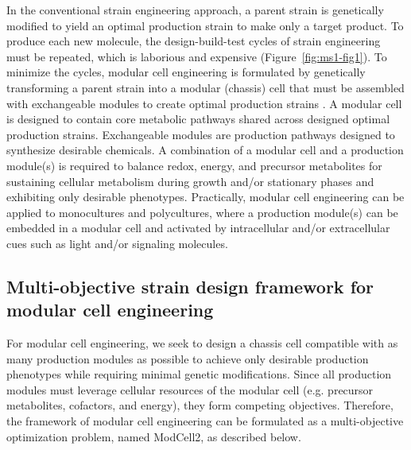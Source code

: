 In the conventional strain engineering approach, a parent strain is genetically modified to yield an optimal production strain to make only a target product.
To produce each new molecule, the design-build-test cycles of strain engineering must be repeated, which is laborious and expensive (Figure~\ref{fig:ms1-fig1}).
To minimize the cycles, modular cell engineering is formulated by genetically transforming a parent strain into a modular (chassis) cell that must be assembled with exchangeable modules to create optimal production strains \citep{trinh2015}.
A modular cell is designed to contain core metabolic pathways shared across designed optimal production strains.
Exchangeable modules are production pathways designed to synthesize desirable chemicals.
A combination of a modular cell and a production module(s) is required to balance redox, energy, and precursor metabolites for sustaining cellular metabolism during growth and/or stationary phases and exhibiting only desirable phenotypes.
Practically, modular cell engineering can be applied to monocultures and polycultures, where a production module(s) can be embedded in a modular cell and activated by intracellular and/or extracellular cues such as light and/or signaling molecules.

\subsection{Multi-objective strain design framework for modular cell engineering}

For modular cell engineering, we seek to design a chassis cell compatible with as many production modules as possible to achieve only desirable production phenotypes while requiring minimal genetic modifications.
Since all production modules must leverage cellular resources of the modular cell (e.g.
precursor metabolites, cofactors, and energy), they form competing objectives.
Therefore, the framework of modular cell engineering can be formulated as a multi-objective optimization problem, named ModCell2, as described below.

